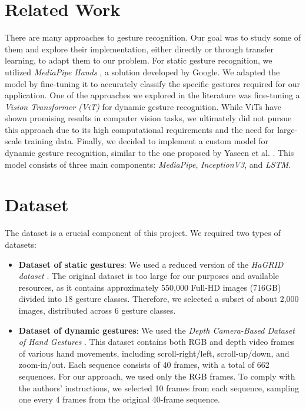 \documentclass[10pt,twocolumn,letterpaper]{article}
\begin{document}
\section{Related Work}
There are many approaches to gesture recognition. Our goal was to study some of them and explore their implementation, either directly or through transfer learning, to adapt them to our problem.  
For static gesture recognition, we utilized \textit{MediaPipe Hands} \cite{zhang2020mediapipehandsondevicerealtime}, a solution developed by Google. We adapted the model by fine-tuning it to accurately classify the specific gestures required for our application.  
One of the approaches we explored in the literature was fine-tuning a \textit{Vision Transformer (ViT)} for dynamic gesture recognition. While ViTs have shown promising results in computer vision tasks, we ultimately did not pursue this approach due to its high computational requirements and the need for large-scale training data.  
Finally, we decided to implement a custom model for dynamic gesture recognition, similar to the one proposed by Yaseen et al. \cite{electronics13163233}. This model consists of three main components: \textit{MediaPipe}, \textit{InceptionV3}, and \textit{LSTM}.  

\section{Dataset}  
The dataset is a crucial component of this project. We required two types of datasets:  

\begin{itemize}  
   \item \textbf{Dataset of static gestures}: We used a reduced version of the \textit{HaGRID dataset} \cite{Alexander_2024}.  
   The original dataset is too large for our purposes and available resources, as it contains approximately 550,000 Full-HD images (716GB) divided into 18 gesture classes.  
   Therefore, we selected a subset of about 2,000 images, distributed across 6 gesture classes.  

   \item \textbf{Dataset of dynamic gestures}: We used the \textit{Depth Camera-Based Dataset of Hand Gestures} \cite{JEERU2022108659}.  
   This dataset contains both RGB and depth video frames of various hand movements, including scroll-right/left, scroll-up/down, and zoom-in/out. Each sequence consists of 40 frames, with a total of 662 sequences.  
   For our approach, we used only the RGB frames. To comply with the authors’ instructions, we selected 10 frames from each sequence, sampling one every 4 frames from the original 40-frame sequence.  
\end{itemize}  
\end{document}
